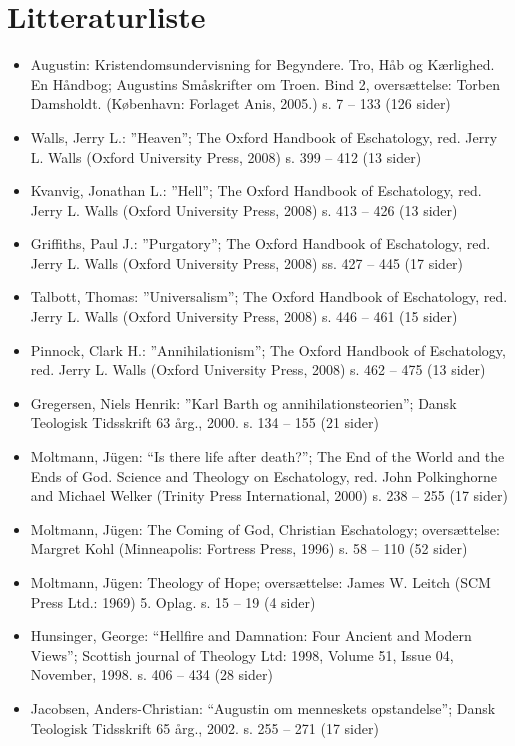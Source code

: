 \chapter{Litteraturliste}
\begin{itemize}
\item Augustin: Kristendomsundervisning for Begyndere. Tro, Håb og Kærlighed. En Håndbog; Augustins Småskrifter om Troen. Bind 2, oversættelse: Torben Damsholdt. (København: Forlaget Anis, 2005.) s. 7 – 133 (126 sider)
\item Walls, Jerry L.: ”Heaven”; The Oxford Handbook of Eschatology, red. Jerry L. Walls (Oxford University Press, 2008) s. 399 – 412 (13 sider)
\item Kvanvig, Jonathan L.: ”Hell”; The Oxford Handbook of Eschatology, red. Jerry L. Walls (Oxford University Press, 2008) s. 413 – 426 (13 sider)
\item Griffiths, Paul J.:  ”Purgatory”; The Oxford Handbook of Eschatology, red. Jerry L. Walls (Oxford University Press, 2008) ss. 427 – 445 (17 sider)
\item Talbott, Thomas: ”Universalism”; The Oxford Handbook of Eschatology, red. Jerry L. Walls (Oxford University Press, 2008) s. 446 – 461 (15 sider)
\item Pinnock, Clark H.: ”Annihilationism”; The Oxford Handbook of Eschatology, red. Jerry L. Walls (Oxford University Press, 2008) s. 462 – 475 (13 sider)
\item Gregersen, Niels Henrik: ”Karl Barth og annihilationsteorien”; Dansk Teologisk Tidsskrift 63 årg., 2000. s. 134 – 155 (21 sider)
\item Moltmann, Jügen: “Is there life after death?”; The End of the World and the Ends of God. Science and Theology on Eschatology, red. John Polkinghorne and Michael Welker (Trinity Press International, 2000) s. 238 – 255 (17 sider)
\item Moltmann, Jügen: The Coming of  God, Christian Eschatology; oversættelse: Margret Kohl (Minneapolis: Fortress Press, 1996) s. 58 – 110 (52 sider)
\item Moltmann, Jügen: Theology of Hope; oversættelse: James W. Leitch (SCM Press Ltd.: 1969) 5. Oplag. s. 15 – 19 (4 sider) 
\item Hunsinger, George: “Hellfire and Damnation: Four Ancient and Modern Views”; Scottish journal of Theology Ltd: 1998, Volume 51, Issue 04, November, 1998. s. 406 – 434 (28 sider)
\item Jacobsen, Anders-Christian: “Augustin om menneskets opstandelse”; Dansk Teologisk Tidsskrift 65 årg., 2002. s. 255 – 271 (17 sider)

\end{itemize}
